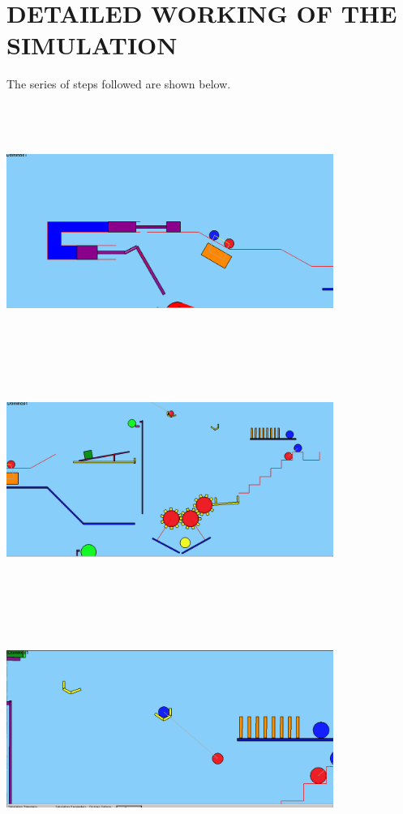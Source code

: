 \documentclass{article}
\begin{document}
\section*{\huge{ DETAILED WORKING OF THE SIMULATION}}
\large{
The series of steps followed are shown below.
\\
\\
\includegraphics[width=0.8\textwidth, height=80mm]{2.png}
\\
\includegraphics[width=0.8\textwidth, height=80mm]{3.png}
\\
\includegraphics[width=0.8\textwidth, height=80mm]{4.png}
}
\end{document}
